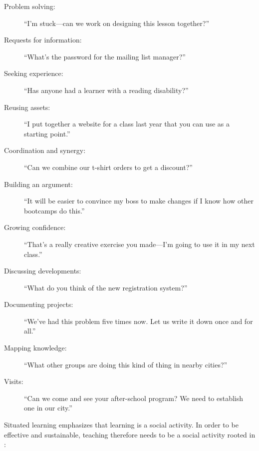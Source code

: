 \begin{description}

\item[Problem solving:]
  ``I'm stuck---can we work on designing this lesson together?''

\item[Requests for information:]
  ``What's the password for the mailing list manager?''

\item[Seeking experience:]
  ``Has anyone had a learner with a reading disability?''

\item[Reusing assets:]
  ``I put together a website for a class last year that you can use as a starting point.''

\item[Coordination and synergy:]
  ``Can we combine our t-shirt orders to get a discount?''

\item[Building an argument:]
  ``It will be easier to convince my boss to make changes if I know how other bootcamps do this.''

\item[Growing confidence:]
  ``That's a really creative exercise you made---I'm going to use it in my next class.''

\item[Discussing developments:]
  ``What do you think of the new registration system?''

\item[Documenting projects:]
  ``We've had this problem five times now. Let us write it down once and for all.''

\item[Mapping knowledge:]
  ``What other groups are doing this kind of thing in nearby cities?''

\item[Visits:]
  ``Can we come and see your after-school program? We need to establish one in our city.''

\end{description}

Situated learning emphasizes that learning is a social activity.
In order to be effective and sustainable,
teaching therefore needs to be a social activity
rooted in :

